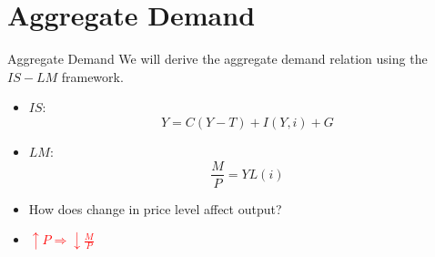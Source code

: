 \documentclass[shownotes,11pt, aspectratio=169]{beamer}
\begin{document}
\begin{frame}
\end{frame}

\begin{frame}
\end{frame}

\section{Aggregate Demand}

\begin{frame}{Aggregate Demand}
We will derive the aggregate demand relation using the $IS-LM$ framework.
\begin{itemize}
\item $IS$: \[Y = C(Y - T) + I(Y,i) + G \]
\item $LM$: \[ \frac{M}{P} = Y L(i) \] \pause
\item How does change in price level affect output? \pause
\item \textcolor{red}{$\uparrow P \Rightarrow \downarrow \frac{M}{P}$}
\end{itemize}
\end{frame}
\end{document}
